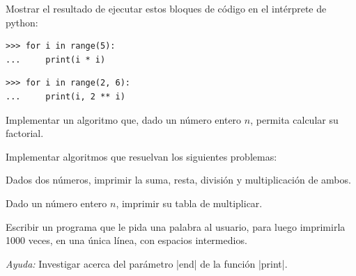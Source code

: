 \begin{ejercicio}
Mostrar el resultado de ejecutar estos bloques de código en el
intérprete de python:
\begin{partes}
\item \begin{verbatim}
>>> for i in range(5):
...     print(i * i)
\end{verbatim}
\item \begin{verbatim}
>>> for i in range(2, 6):
...     print(i, 2 ** i)
\end{verbatim}
\end{partes}
\end{ejercicio}

\begin{ejercicio} Implementar un algoritmo que, dado un número entero $n$,
    permita calcular su factorial.
\end{ejercicio}

\begin{ejercicio} Implementar algoritmos que resuelvan los siguientes
problemas:
\begin{partes}
  \item Dados dos números, imprimir la suma, resta, división y multiplicación
  de ambos.
  \item Dado un número entero $n$, imprimir su tabla de multiplicar.
\end{partes}
\end{ejercicio}

\begin{ejercicio}
Escribir un programa que le pida una palabra al usuario, para luego
imprimirla 1000 veces, en una única línea, con espacios intermedios.

{\it Ayuda:} Investigar acerca del parámetro |end| de la función |print|.
\end{ejercicio}
